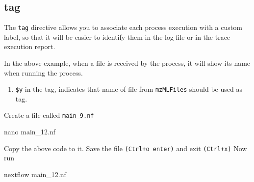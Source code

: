 \documentclass[
]{book}
\newenvironment{Shaded}{\begin{snugshade}}{\end{snugshade}}
\newcommand{\CommentTok}[1]{\textcolor[rgb]{0.56,0.35,0.01}{\textit{#1}}}
\newcommand{\ErrorTok}[1]{\textcolor[rgb]{0.64,0.00,0.00}{\textbf{#1}}}
\newcommand{\ExtensionTok}[1]{#1}
\newcommand{\FunctionTok}[1]{\textcolor[rgb]{0.00,0.00,0.00}{#1}}
\newcommand{\KeywordTok}[1]{\textcolor[rgb]{0.13,0.29,0.53}{\textbf{#1}}}
\newcommand{\NormalTok}[1]{#1}
\newcommand{\StringTok}[1]{\textcolor[rgb]{0.31,0.60,0.02}{#1}}
\newcommand{\VariableTok}[1]{\textcolor[rgb]{0.00,0.00,0.00}{#1}}
\providecommand{\tightlist}{%
  \setlength{\itemsep}{0pt}\setlength{\parskip}{0pt}}
\begin{document}
\hypertarget{tag}{%
\subsection{tag}\label{tag}}

The \texttt{tag} directive allows you to associate each process execution with a custom label, so that it will be easier to identify them in the log file or in the trace execution report.

\begin{Shaded}
\end{Shaded}

In the above example, when a file is received by the process, it will show its name when running the process.

\begin{enumerate}
\def\labelenumi{\arabic{enumi}.}
\tightlist
\item
  \texttt{\$y} in the tag, indicates that name of file from \texttt{mzMLFiles} should be used as tag.
\end{enumerate}

Create a file called \texttt{main\_9.nf}

\begin{Shaded}
\begin{Highlighting}[numbers=left,,]
\FunctionTok{nano}\NormalTok{ main\_12.nf}
\end{Highlighting}
\end{Shaded}

Copy the above code to it. Save the file \texttt{(Ctrl+o\ enter)} and exit \texttt{(Ctrl+x)}
Now run

\begin{Shaded}
\begin{Highlighting}[numbers=left,,]
\ExtensionTok{nextflow}\NormalTok{ main\_12.nf}
\end{Highlighting}
\end{Shaded}
\end{document}
